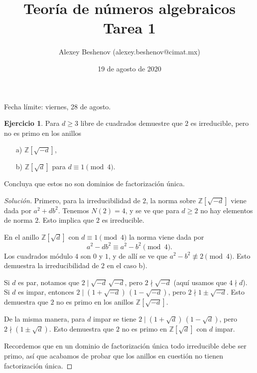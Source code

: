 \documentclass{article}
\title{Teoría de números algebraicos\\Tarea 1}
\author{Alexey Beshenov (alexey.beshenov@cimat.mx)}
\date{19 de agosto de 2020}
\newcounter{tarea}
\theoremstyle{definition}
\newtheorem{ejercicio}{Ejercicio}[tarea]
\newenvironment{solucion}{\begin{proof}[Solución]}{\end{proof}}
\begin{document}
{\sffamily\bfseries\maketitle}

\noindent Fecha límite: viernes, 28 de agosto.

\ifdefined\solutions
\else
\thispagestyle{empty}
\fi

\begin{ejercicio}
  Para $d \ge 3$ libre de cuadrados demuestre que $2$ es irreducible,
  pero no es primo en los anillos
  \begin{enumerate}
  \item[a)] $\mathbb{Z} [\sqrt{-d}]$,
  \item[b)] $\mathbb{Z} [\sqrt{d}]$ para $d \equiv 1 \pmod{4}$.
  \end{enumerate}

  Concluya que estos no son dominios de factorización única.

  \ifdefined\solutions
  \begin{solucion}
    Primero, para la irreducibilidad de $2$, la norma sobre
    $\mathbb{Z} [\sqrt{-d}]$ viene dada por $a^2 + db^2$.    
    Tenemos $N (2) = 4$, y se ve que para $d \ge 2$ no hay elementos de norma
    $2$. Esto implica que $2$ es irreducible.

    En el anillo $\mathbb{Z} [\sqrt{d}]$ con $d \equiv 1 \pmod{4}$ la norma
    viene dada por
    $$a^2 - db^2 \equiv a^2 - b^2 \pmod{4}.$$
    Los cuadrados módulo $4$ son $0$ y $1$, y de allí se ve que
    $a^2 - b^2 \not\equiv 2 \pmod{4}$. Esto demuestra la irreducibilidad de $2$
    en el caso b).

    Si $d$ es par, notamos que $2 \mid \sqrt{-d}\,\sqrt{-d}$, pero
    $2 \nmid \sqrt{-d}$ (aquí usamos que $4\nmid d$). Si $d$ es impar, entonces
    $2 \mid (1 + \sqrt{-d})\,(1 - \sqrt{-d})$, pero $2 \nmid 1 \pm \sqrt{-d}$.
    Esto demuestra que $2$ no es primo en los anillos $\mathbb{Z} [\sqrt{-d}]$.

    De la misma manera, para $d$ impar se tiene
    $2 \mid (1 + \sqrt{d})\,(1 - \sqrt{d})$, pero $2 \nmid (1 \pm \sqrt{d})$.
    Esto demuestra que $2$ no es primo en $\mathbb{Z} [\sqrt{d}]$ con $d$
    impar.

    Recordemos que en un dominio de factorización única todo irreducible debe
    ser primo, así que acabamos de probar que los anillos en cuestión no tienen
    factorización única.
  \end{solucion}
  \fi
\end{ejercicio}
\end{document}
